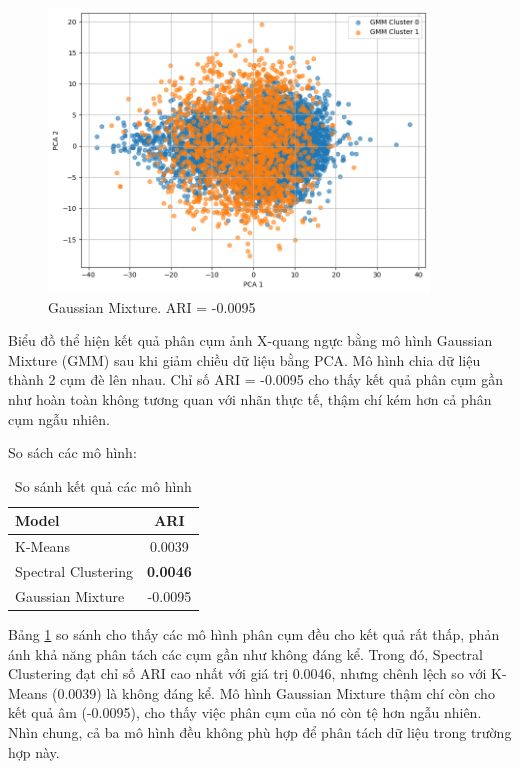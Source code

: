     \begin{figure}[htp]
        \centering
        \includegraphics[width=0.90\textwidth]{images/Img_lung_gauss.png}
        \caption{Gaussian Mixture. ARI = -0.0095}
        \label{fig:Img_lung_gauss}
    \end{figure}
    \FloatBarrier

    Biểu đồ thể hiện kết quả phân cụm ảnh X-quang ngực bằng mô hình Gaussian Mixture (GMM) sau khi giảm chiều dữ liệu bằng PCA. Mô hình chia dữ liệu thành 2 cụm đè lên nhau. Chỉ số ARI = -0.0095 cho thấy kết quả phân cụm gần như hoàn toàn không tương quan với nhãn thực tế, thậm chí kém hơn cả phân cụm ngẫu nhiên.

    So sách các mô hình:

    \begin{table}[htbp]
        \centering
        \caption{So sánh kết quả các mô hình}
        \label{tab:lung-clustering-compare}
        \begin{tabular}{|l|c|}
        \hline
         Model & ARI  \\
        \hline
        K-Means & 0.0039  \\
        \hline
        Spectral Clustering & \textbf{0.0046} \\
        \hline
        Gaussian Mixture & -0.0095  \\
        \hline
        \end{tabular}
    \end{table}

    \FloatBarrier

    Bảng \ref{tab:lung-clustering-compare} so sánh cho thấy các mô hình phân cụm đều cho kết quả rất thấp, phản ánh khả năng phân tách các cụm gần như không đáng kể. Trong đó, Spectral Clustering đạt chỉ số ARI cao nhất với giá trị 0.0046, nhưng chênh lệch so với K-Means (0.0039) là không đáng kể. Mô hình Gaussian Mixture thậm chí còn cho kết quả âm (-0.0095), cho thấy việc phân cụm của nó còn tệ hơn ngẫu nhiên. Nhìn chung, cả ba mô hình đều không phù hợp để phân tách dữ liệu trong trường hợp này.
    

    